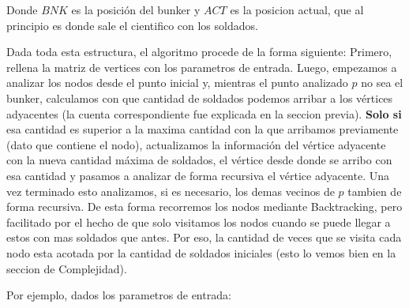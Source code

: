 
\medskip

Donde $BNK$ es la posición del bunker y $ACT$ es la posicion actual, que al principio es donde sale el cientifico con los soldados.

\medskip

Dada toda esta estructura, el algoritmo procede de la forma siguiente: 
Primero, rellena la matriz de vertices con los parametros de entrada. Luego, empezamos a analizar los nodos desde el punto inicial y, mientras el punto analizado $p$ no sea el bunker, calculamos con que cantidad de soldados podemos arribar a los vértices adyacentes (la cuenta correspondiente fue explicada en la seccion previa). \textbf{Solo si} esa cantidad es superior a la maxima cantidad con la que arribamos previamente (dato que contiene el nodo), actualizamos la información del vértice adyacente con la nueva cantidad máxima de soldados, el vértice desde donde se arribo con esa cantidad y pasamos a analizar de forma recursiva el vértice adyacente. Una vez terminado esto analizamos, si es necesario, los demas vecinos de $p$ tambien de forma recursiva. De esta forma recorremos los nodos mediante Backtracking, pero facilitado por el hecho de que solo visitamos los nodos cuando se puede llegar a estos con mas soldados que antes. Por eso, la cantidad de veces que se visita cada nodo esta acotada por la cantidad de soldados iniciales (esto lo vemos bien en la seccion de Complejidad).

\medskip

Por ejemplo, dados los parametros de entrada:

